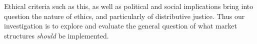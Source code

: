 Ethical criteria such as this, as well as political and social implications bring into question the nature of ethics, and particularly of distributive justice. 
Thus our investigation is to explore and evaluate the general question of what market structures \textit{should} be implemented.


